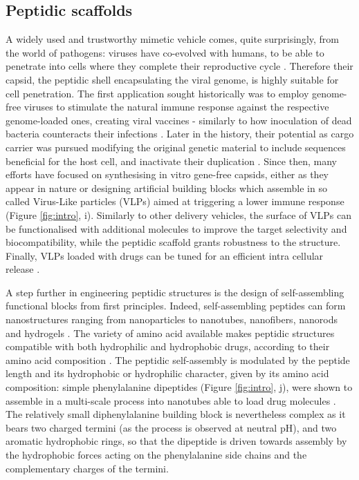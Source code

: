 \subsection{Peptidic scaffolds} \label{sec:peptidic_delivery}
A widely used and trustworthy mimetic vehicle comes, quite surprisingly, from the world of pathogens: viruses have co-evolved with humans, to be able to penetrate into cells where they complete their reproductive cycle \citep{Lobo2009}. Therefore their capsid, the peptidic shell encapsulating the viral genome, is highly suitable for cell penetration. The first application sought historically was to employ genome-free viruses to stimulate the natural immune response against the respective genome-loaded ones, creating viral vaccines - similarly to how inoculation of dead bacteria counteracts their infections \citep{Lauer2017}.
Later in the history, their potential as cargo carrier was pursued modifying the original genetic material to include sequences beneficial for the host cell, and inactivate their duplication \citep{Daya2008}.
%
Since then, many efforts have focused on synthesising in vitro gene-free capsids, either as they appear in nature \citep{Wu2009} or designing artificial building blocks which assemble in so called Virus-Like particles (VLPs) \citep{Schoonen2014} aimed at triggering a lower immune response (Figure \ref{fig:intro}, i).
%
Similarly to other delivery vehicles, the surface of VLPs can be functionalised with additional molecules to improve the target selectivity and biocompatibility, while the peptidic scaffold grants robustness to the structure. Finally, VLPs loaded with drugs can be tuned for an efficient intra cellular release \citep{Ma2012}.

A step further in engineering peptidic structures is the design of self-assembling functional blocks from first principles. Indeed, self-assembling peptides can form nanostructures ranging from nanoparticles to nanotubes, nanofibers, nanorods and hydrogels \citep{Fan2017}.
%
The variety of amino acid available makes peptidic structures compatible with both hydrophilic and hydrophobic drugs, according to their amino acid composition \citep{Ma2012}.
%
The peptidic self-assembly is modulated by the peptide length and its hydrophobic or hydrophilic character, given by its amino acid composition: simple phenylalanine dipeptides (Figure \ref{fig:intro}, j), were shown to assemble in a multi-scale process into nanotubes able to load drug molecules \citep{Silva2013}. The relatively small diphenylalanine building block is nevertheless complex as it bears two charged termini (as the process is observed at neutral pH), and two aromatic hydrophobic rings, so that the dipeptide is driven towards assembly by the hydrophobic forces acting on the phenylalanine side chains and the complementary charges of the termini.


